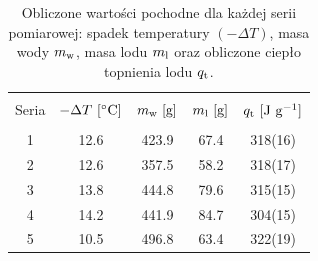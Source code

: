 \begin{table}[htb]
\begin{center}
\renewcommand*{\tablename}{Tabela}
\caption{\small
Obliczone wartości pochodne dla każdej serii pomiarowej: spadek temperatury $(-\Delta T)$, masa wody $ m_{\mathrm{w}} $, masa lodu $ m_{\mathrm{l}} $ oraz obliczone ciepło topnienia lodu $ q_{\mathrm{t}} $.
\vspace{0.15cm}
    \label{tab:cieplo-wlasciwe}}
    {\small
    \begin{tabular}{c c c c c}
    \hline \vspace{-0.35cm} \\
      Seria & $-\Delta T~[ \mathrm{^{\circ}C} ]$
      & $ m_{\mathrm{w}} ~[\mathrm{g}]$ & $ m_{\mathrm{l}} ~[\mathrm{g}]$ & $ q_{\mathrm{t}} ~[\mathrm{J~g^{-1}}]$ \\
      \hline \vspace{-0.2cm} \\
      1 & 12.6 & 423.9 & 67.4 & 318(16) \\
      2 & 12.6 & 357.5 & 58.2 & 318(17) \\
      3 & 13.8 & 444.8 & 79.6 & 315(15) \\
      4 & 14.2 & 441.9 & 84.7 & 304(15) \\
      5 & 10.5 & 496.8 & 63.4 & 322(19) \\
    \hline
    \end{tabular}}
    \end{center}
\end{table}